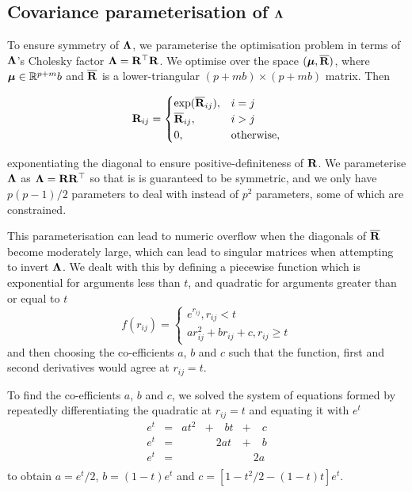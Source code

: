 \documentclass{amsart}[12pt]
\begin{document}
			\subsection{Covariance parameterisation of ${\boldsymbol \Lambda}$}
			
			To ensure symmetry of ${\boldsymbol \Lambda}$, we parameterise the optimisation problem in terms of ${\boldsymbol \Lambda}$'s
			Cholesky factor  ${\boldsymbol \Lambda} = {\bf R}^\top {\bf R}$. We optimise over the space $({\boldsymbol \mu}, \overline{{\bf R}})$, where ${\boldsymbol \mu}
			\in {\mathbb{R}}^{p + m}b$ and $\overline{{\bf R}}$ is a lower-triangular $(p + mb) \times (p + mb)$ matrix. Then
					
			\begin{equation*}
				{\bf R}_{ij} =
				\begin{cases}
					\exp(\overline{{\bf R}}_{ij}), & i = j             \\
					\overline{{\bf R}}_{ij},       & i > j             \\
					0,                         & \text{otherwise}, 
				\end{cases}
			\end{equation*}
					
			\noindent exponentiating the diagonal to ensure positive-definiteness of ${\bf R}$. We parameterise ${\boldsymbol \Lambda}$
			as ${\boldsymbol \Lambda} = {\bf R} {\bf R}^\top$ so that is is guaranteed to be symmetric, and we only have $p(p-1)/2$ 
			parameters to deal with instead of $p^2$ parameters, some of which are constrained. 
			
			This parameterisation can lead to numeric overflow when the diagonals of $\overline{{\bf R}}$ become moderately
			large, which can lead to singular matrices when attempting to invert ${\boldsymbol \Lambda}$. We dealt with this by
			defining a piecewise function which is exponential for arguments less than $t$, and quadratic for arguments
			greater than or equal to $t$
			$$
			f(r_{ij}) =
			\begin{cases}
				e^{r_{ij}}, r_{ij} < t                   \\
				a r_{ij}^2 + b r_{ij} + c, r_{ij} \geq t 
			\end{cases}
			$$
			and then choosing the co-efficients $a$, $b$ and $c$ such that the function, first and second derivatives would
			agree at $r_{ij} = t$.
			
			To find the co-efficients $a$, $b$ and $c$, we solved the system of equations formed by repeatedly 
			differentiating the quadratic at $r_{ij} =  t$ and equating it with $e^t$
			$$
			\begin{array}{lllll}
				e^t & = & a t^2 & + \quad b t & + \quad c \\
				e^t & = &       & \quad 2a t  & + \quad b \\
				e^t & = &       &             & \quad 2a  \\
			\end{array}
			$$
			to obtain $a = e^t / 2$, $b = (1 - t) e^t$ and $c = [1 - t^2/2 - (1 - t) t] e^t$.
			
\end{document}

